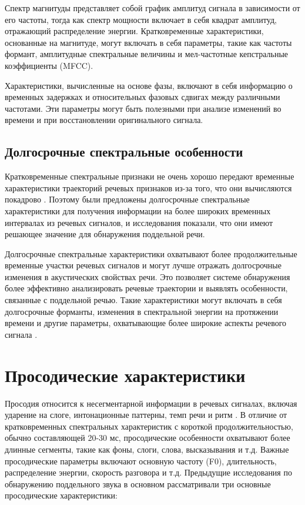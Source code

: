 Спектр магнитуды представляет собой график амплитуд сигнала в зависимости от его частоты, тогда как спектр мощности включает в себя квадрат амплитуд, отражающий распределение энергии. Кратковременные характеристики, основанные на магнитуде, могут включать в себя параметры, такие как частоты формант, амплитудные спектральные величины и мел-частотные кепстральные коэффициенты (MFCC).

Характеристики, вычисленные на основе фазы, включают в себя информацию о временных задержках и относительных фазовых сдвигах между различными частотами. Эти параметры могут быть полезными при анализе изменений во времени и при восстановлении оригинального сигнала.

\subsection{Долгосрочные спектральные особенности}

Кратковременные спектральные признаки не очень хорошо передают временные характеристики траекторий речевых признаков из-за того, что они вычисляются покадрово \cite{wu2013synthetic}. Поэтому были предложены долгосрочные спектральные характеристики для получения информации на более широких временных интервалах из речевых сигналов, и исследования показали, что они имеют решающее значение для обнаружения поддельной речи.

Долгосрочные спектральные характеристики охватывают более продолжительные временные участки речевых сигналов и могут лучше отражать долгосрочные изменения в акустических свойствах речи. Это позволяет системе обнаружения более эффективно анализировать речевые траектории и выявлять особенности, связанные с поддельной речью. Такие характеристики могут включать в себя долгосрочные форманты, изменения в спектральной энергии на протяжении времени и другие параметры, охватывающие более широкие аспекты речевого сигнала \cite{das2019long}.

\section{Просодические характеристики}

Просодия относится к несегментарной информации в речевых сигналах, включая ударение на слоге, интонационные паттерны, темп речи и ритм \cite{kinnunen2010overview}. В отличие от кратковременных спектральных характеристик с короткой продолжительностью, обычно составляющей 20-30 мс, просодические особенности охватывают более длинные сегменты, такие как фоны, слоги, слова, высказывания и т.д. Важные просодические параметры включают основную частоту (F0), длительность, распределение энергии, скорость разговора и т.д. Предыдущие исследования \cite{kinnunen2010overview} по обнаружению поддельного звука в основном рассматривали три основные просодические характеристики:

